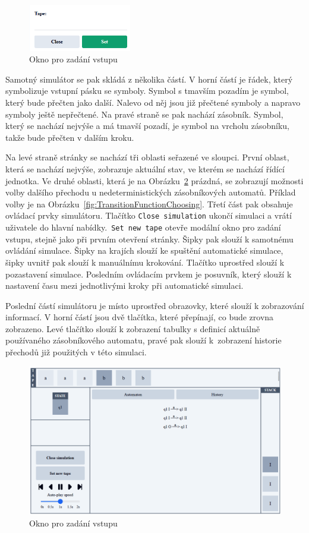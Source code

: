 \begin{figure}[h]
    \centering
    \includegraphics[width=0.4\textwidth]{Figures/PrntScrn_UI_TapeInput.png}
    \caption{Okno pro zadání vstupu}\label{fig:TapeInput}
\end{figure}

Samotný simulátor se pak skládá z několika částí. V horní částí je řádek, který symbolizuje vstupní pásku se symboly. Symbol s tmavším pozadím je symbol, který bude přečten jako další. Nalevo od něj jsou již přečtené symboly a napravo symboly ještě nepřečtené. Na pravé straně se pak nachází zásobník. Symbol, který se nachází nejvýše a má tmavší pozadí, je symbol na vrcholu zásobníku, takže bude přečten v dalším kroku. 

Na levé straně stránky se nachází tři oblasti seřazené ve sloupci. První oblast, která se nachází nejvýše, zobrazuje aktuální stav, ve kterém se nachází řídící jednotka. Ve druhé oblasti, která je na Obrázku~\ref{fig:Simulator} prázdná, se zobrazují možnosti volby dalšího přechodu u nedeterministických zásobníkových automatů. Příklad volby je na Obrázku~\ref{fig:TransitionFunctionChoosing}. Třetí část pak obsahuje ovládací prvky simulátoru. Tlačítko \texttt{Close simulation} ukončí simulaci a vrátí uživatele do hlavní nabídky.\ \texttt{Set new tape} otevře modální okno pro zadání vstupu, stejně jako při prvním otevření stránky.
Šipky pak slouží k samotnému ovládání simulace. Šipky na krajích slouží ke spuštění automatické simulace, šipky uvnitř pak slouží k manuálnímu krokování. Tlačítko uprostřed slouží k pozastavení simulace. Posledním ovládacím prvkem je posuvník, který slouží k nastavení času mezi jednotlivými kroky při automatické simulaci.

Poslední částí simulátoru je místo uprostřed obrazovky, které slouží k zobrazování informací. V horní částí jsou dvě tlačítka, které přepínají, co bude zrovna zobrazeno. Levé tlačítko slouží k zobrazení tabulky s definicí aktuálně používaného zásobníkového automatu, pravé pak slouží k~zobrazení historie přechodů již použitých v této simulaci.

\begin{figure}[h]
    \centering
    \includegraphics[width=\textwidth]{Figures/PrntScrn_UI_Simulator.png}
    \caption{Okno pro zadání vstupu}\label{fig:Simulator}
\end{figure}

\endinput